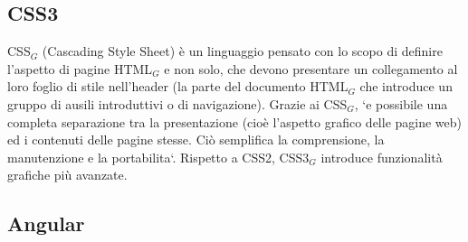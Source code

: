 \subsection{CSS3}
CSS$_G$ (Cascading Style Sheet) è un linguaggio pensato con lo scopo di definire l'aspetto di pagine HTML$_G$ e non solo, che devono presentare un collegamento al loro foglio di stile nell'header (la parte del documento HTML$_G$ che introduce un gruppo di ausili introduttivi o di navigazione). Grazie ai CSS$_G$, `e possibile una completa separazione tra la presentazione (cioè l'aspetto grafico delle pagine web) ed i contenuti delle pagine stesse. Ciò semplifica la comprensione, la manutenzione e la portabilita`. Rispetto a CSS2, CSS3$_G$ introduce funzionalità grafiche più avanzate.

\subsection{Angular}


